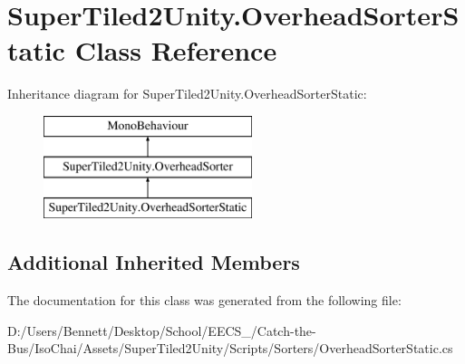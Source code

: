 \hypertarget{class_super_tiled2_unity_1_1_overhead_sorter_static}{}\section{Super\+Tiled2\+Unity.\+Overhead\+Sorter\+Static Class Reference}
\label{class_super_tiled2_unity_1_1_overhead_sorter_static}
Inheritance diagram for Super\+Tiled2\+Unity.\+Overhead\+Sorter\+Static\+:\begin{figure}[H]
\begin{center}
\leavevmode
\includegraphics[height=3.000000cm]{class_super_tiled2_unity_1_1_overhead_sorter_static}
\end{center}
\end{figure}
\subsection*{Additional Inherited Members}


The documentation for this class was generated from the following file\+:\begin{DoxyCompactItemize}
\item 
D\+:/\+Users/\+Bennett/\+Desktop/\+School/\+E\+E\+C\+S\+\_/\+Catch-\/the-\/\+Bus/\+Iso\+Chai/\+Assets/\+Super\+Tiled2\+Unity/\+Scripts/\+Sorters/Overhead\+Sorter\+Static.\+cs\end{DoxyCompactItemize}
